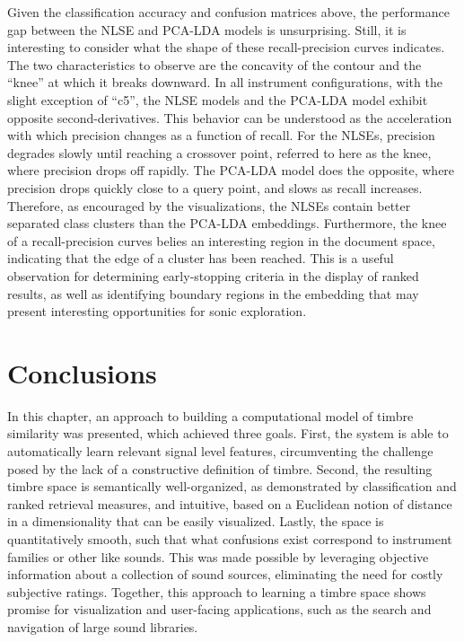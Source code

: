 Given the classification accuracy and confusion matrices above, the performance gap between the NLSE and PCA-LDA models is unsurprising.
Still, it is interesting to consider what the shape of these recall-precision curves indicates.
The two characteristics to observe are the concavity of the contour and the ``knee'' at which it breaks downward.
In all instrument configurations, with the slight exception of ``c5'', the NLSE models and the PCA-LDA model exhibit opposite second-derivatives.
This behavior can be understood as the acceleration with which precision changes as a function of recall.
For the NLSEs, precision degrades slowly until reaching a crossover point, referred to here as the knee, where precision drops off rapidly.
The PCA-LDA model does the opposite, where precision drops quickly close to a query point, and slows as recall increases.
Therefore, as encouraged by the visualizations, the NLSEs contain better separated class clusters than the PCA-LDA embeddings.
Furthermore, the knee of a recall-precision curves belies an interesting region in the document space, indicating that the edge of a cluster has been reached.
This is a useful observation for determining early-stopping criteria in the display of ranked results, as well as identifying boundary regions in the embedding that may present interesting opportunities for sonic exploration.



\section{Conclusions}
\label{sec:conclusions}

In this chapter, an approach to building a computational model of timbre similarity was presented, which achieved three goals.
First, the system is able to automatically learn relevant signal level features, circumventing the challenge posed by the lack of a constructive definition of timbre.
Second, the resulting timbre space is semantically well-organized, as demonstrated by classification and ranked retrieval measures, and intuitive, based on a Euclidean notion of distance in a dimensionality that can be easily visualized.
Lastly, the space is quantitatively smooth, such that what confusions exist correspond to instrument families or other like sounds.
This was made possible by leveraging objective information about a collection of sound sources, eliminating the need for costly subjective ratings.
Together, this approach to learning a timbre space shows promise for visualization and user-facing applications, such as the search and navigation of large sound libraries.

